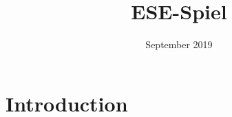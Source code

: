 \documentclass{article}
\title{ESE-Spiel}
\author{ }
\date{September 2019}
\begin{document}
\maketitle

\section{Introduction}



\newpage

\end{document}
